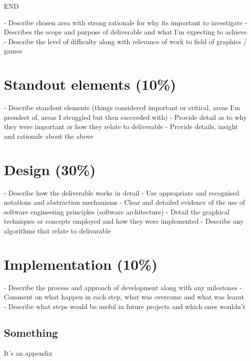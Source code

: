 \documentclass[11pt, a4paper]{article}
\begin{document}
END

- Describe chosen area with strong rationale for why its important to investigate
- Describes the scope and purpose of deliverable and what I'm expecting to achieve
- Describe the level of difficulty along with relevance of work to field of graphics / games

\section{Standout elements (10\%)}

- Describe standout elements (things considered important or critical, areas I'm proudest of, areas I struggled but then succeeded with)
- Provide detail as to why they were important or how they relate to deliverable
- Provide details, insight and rationale about the above

\section{Design (30\%)}

- Describe how the deliverable works in detail
- Use appropriate and recognised notations and abstraction mechanisms
- Clear and detailed evidence of the use of software engineering principles (software architecture)
- Detail the graphical techniques or concepts employed and how they were implemented
- Describe any algorithms that relate to delivarable

\section{Implementation (10\%)}

- Describe the process and approach of development along with any milestones
- Comment on what happen in each step, what was overcome and what was learnt
- Describe what steps would be useful in future projects and which ones wouldn't

\cleardoublepage
\printbibliography[
  heading=bibintoc,
  title={Bibliography}
]

\cleardoublepage
\begin{appendices}

\section{Something}

It's an appendix

\end{appendices}
\end{document}
